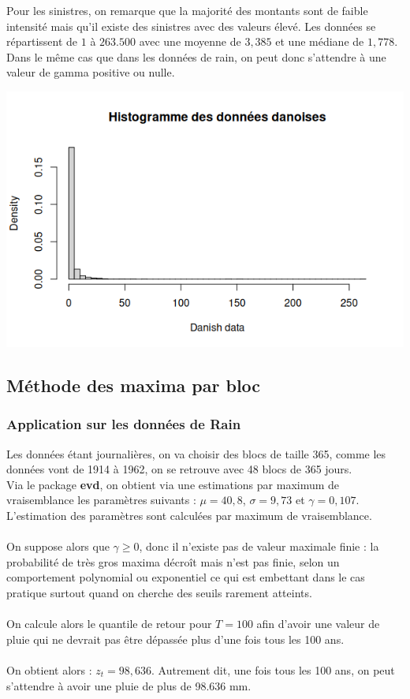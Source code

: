 \documentclass{article}
\theoremstyle{plain}
\theoremstyle{definition}
\theoremstyle{plain}
\begin{document}
\noindent Pour les sinistres, on remarque que la majorité des montants sont de faible intensité mais qu'il existe des sinistres avec des valeurs élevé. Les données se répartissent de $1$ à $263.500$ avec une moyenne de $3,385$ et une médiane de $1,778$. Dans le même cas que dans les données de rain, on peut donc s'attendre à une valeur de gamma positive ou nulle.
\begin{center}
	\includegraphics[scale=0.62]{./images/sinistres.png} 
\end{center}

\subsection{Méthode des maxima par bloc}

\subsubsection{Application sur les données de Rain}

\noindent Les données étant journalières, on va choisir des blocs de taille 365, comme les données vont de 1914 à 1962, on se retrouve avec 48 blocs de 365 jours.
\\
Via le package \textbf{evd}, on obtient via une estimations par maximum de vraisemblance les paramètres suivants : $\mu = 40,8$, $\sigma = 9,73$ et $\gamma = 0,107$.
\\
L'estimation des paramètres sont calculées par maximum de vraisemblance.
\\
\\
On suppose alors que $\gamma \geq 0$, donc il n’existe pas de valeur maximale finie : la probabilité de très gros maxima décroît mais n'est pas finie, selon un comportement polynomial ou exponentiel ce qui est embettant dans le cas pratique surtout quand on cherche des seuils rarement atteints.
\\
\\
On calcule alors le quantile de retour pour $T=100$ afin d'avoir une valeur de pluie qui ne devrait pas être dépassée plus d'une fois tous les 100 ans.
\\
\\
On obtient alors : $z_t = 98,636$. Autrement dit, une fois tous les 100 ans, on peut s'attendre à avoir une pluie de plus de 98.636 mm.
\end{document}
